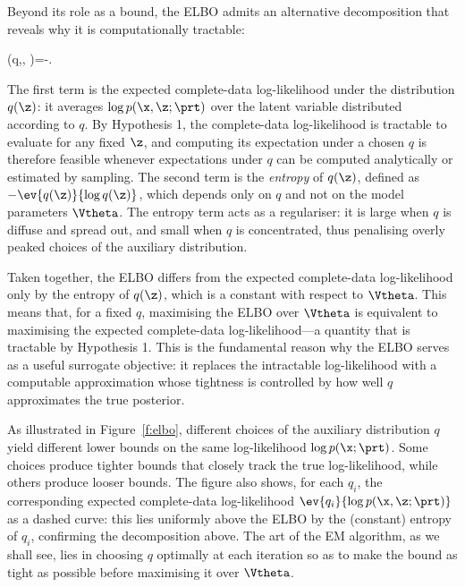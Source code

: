Beyond its role as a bound, the ELBO admits an alternative decomposition that reveals
why it is computationally tractable:
\begin{myequation}
 \mL(q,\x, \prt)=-.
\end{myequation}
The first term is the expected complete-data log-likelihood under the distribution $q(\z)$:
it averages $\log p(\x,\z;\prt)$ over the latent variable distributed according to $q$. By
Hypothesis 1, the complete-data log-likelihood is tractable to evaluate for any fixed $\z$,
and computing its expectation under a chosen $q$ is therefore feasible whenever
expectations under $q$ can be computed analytically or estimated by sampling. The second
term is the \emph{entropy} of $q(\z)$, defined as $-\ev{q(\z)}{\log q(\z)}$, which depends
only on $q$ and not on the model parameters $\Vtheta$. The entropy term acts as a
regulariser: it is large when $q$ is diffuse and spread out, and small when $q$ is
concentrated, thus penalising overly peaked choices of the auxiliary distribution.

Taken together, the ELBO differs from the expected complete-data log-likelihood only by
the entropy of $q(\z)$, which is a constant with respect to $\Vtheta$. This means that, for
a fixed $q$, maximising the ELBO over $\Vtheta$ is equivalent to maximising the expected
complete-data log-likelihood---a quantity that is tractable by Hypothesis 1. This is the
fundamental reason why the ELBO serves as a useful surrogate objective: it replaces the
intractable log-likelihood with a computable approximation whose tightness is controlled by
how well $q$ approximates the true posterior.

As illustrated in Figure~\ref{f:elbo}, different choices of the auxiliary distribution $q$
yield different lower bounds on the same log-likelihood $\log p(\x;\prt)$. Some choices
produce tighter bounds that closely track the true log-likelihood, while others produce
looser bounds. The figure also shows, for each $q_i$, the corresponding expected
complete-data log-likelihood $\ev{q_i}{\log p(\x,\z;\prt)}$ as a dashed curve: this lies
uniformly above the ELBO by the (constant) entropy of $q_i$, confirming the
decomposition above. The art of the EM algorithm, as we shall see, lies in choosing $q$
optimally at each iteration so as to make the bound as tight as possible before maximising
it over $\Vtheta$.

